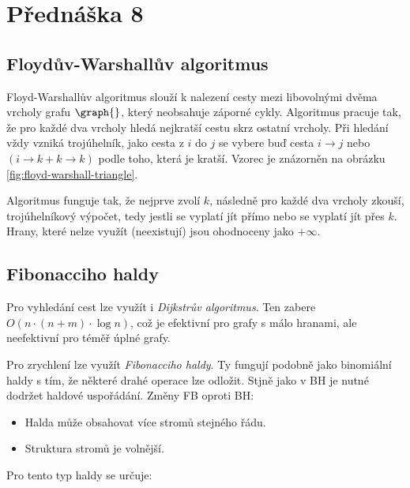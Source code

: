 \section{Přednáška 8}

\subsection{Floydův-Warshallův algoritmus}

Floyd-Warshallův algoritmus slouží k nalezení cesty mezi libovolnými dvěma vrcholy grafu $\graph{}$, který neobsahuje záporné cykly.
Algoritmus pracuje tak, že pro každé dva vrcholy hledá nejkratší cestu skrz ostatní vrcholy.
Při hledání vždy vzniká trojúhelník, jako cesta z $i$ do $j$ se vybere buď cesta $i \rightarrow j$ nebo $(i \rightarrow k + k \rightarrow k)$ podle toho, která je kratší.
Vzorec je znázorněn na obrázku \ref{fig:floyd-warshall-triangle}.


Algoritmus funguje tak, že nejprve zvolí $k$, následně pro každé dva vrcholy zkouší, trojúhelníkový výpočet, tedy jestli se vyplatí jít přímo nebo se vyplatí jít přes $k$.
Hrany, které nelze využít (neexistují) jsou ohodnoceny jako $+\infty$.


\subsection{Fibonacciho haldy}

Pro vyhledání cest lze využít i \textit{Dijkstrův algoritmus}.
Ten zabere $O(n \cdot (n+m) \cdot \log n)$, což je efektivní pro grafy s málo hranami, ale neefektivní pro téměř úplné grafy.

Pro zrychlení lze využít \textit{Fibonacciho haldy}.
Ty fungují podobně jako binomiální haldy s tím, že některé drahé operace lze odložit.
Stjně jako v BH je nutné dodržet haldové uspořádání.
Změny FB oproti BH:

\begin{itemize}
    \item Halda může obsahovat více stromů stejného řádu.
    \item Struktura stromů je volnější.
\end{itemize}

Pro tento typ haldy se určuje:

